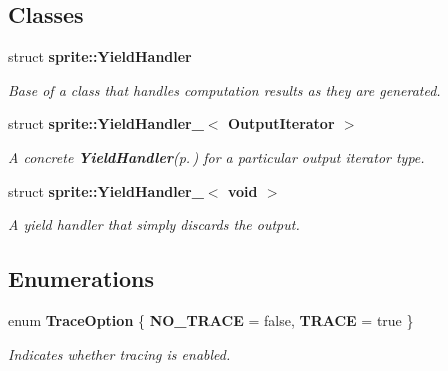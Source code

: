 \subsection*{Classes}
\begin{CompactItemize}
\item 
struct {\bf sprite::Yield\-Handler}
\begin{CompactList}\small\item\em Base of a class that handles computation results as they are generated. \item\end{CompactList}\item 
struct {\bf sprite::Yield\-Handler\_\-$<$ Output\-Iterator $>$}
\begin{CompactList}\small\item\em A concrete {\bf Yield\-Handler}{\rm (p.\,\pageref{structsprite_1_1YieldHandler})} for a particular output iterator type. \item\end{CompactList}\item 
struct {\bf sprite::Yield\-Handler\_\-$<$ void $>$}
\begin{CompactList}\small\item\em A yield handler that simply discards the output. \item\end{CompactList}\end{CompactItemize}
\subsection*{Enumerations}
\begin{CompactItemize}
\item 
enum {\bf Trace\-Option} \{ {\bf NO\_\-TRACE} = false, 
{\bf TRACE} = true
 \}
\begin{CompactList}\small\item\em Indicates whether tracing is enabled. \item\end{CompactList}\end{CompactItemize}
